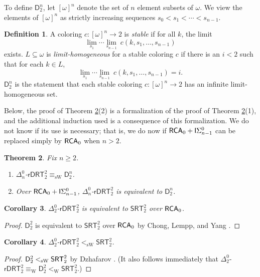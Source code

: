 \documentclass{amsart}
\newtheorem{thm}{Theorem}[section]
\newtheorem{cor}[thm]{Corollary}
\theoremstyle{definition}
\newtheorem{defn}[thm]{Definition}
\theoremstyle{remark}
\newcommand{\system}[1]{\mbox{\fontfamily{cmss}\fontshape{n}\fontseries{m}%
    \selectfont#1}}
\newcommand{\RCA}{\system{RCA}\ensuremath{_0}}
\newcommand{\SRT}{\system{SRT}}
\begin{document}
To define $\mathsf{D}^n_2$, let $[\omega]^n$ denote the set of $n$ element subsets of $\omega$. We view the elements of $[\omega]^n$ as strictly increasing sequences 
$s_0 < s_1 < \cdots < s_{n-1}$. 

\begin{defn}
A coloring $c:[\omega]^n \rightarrow 2$ is \textit{stable} if for all $k$, the limit 
\[
\lim_{s_1} \cdots \lim_{s_{n-1}}~c(k,s_1,\ldots,s_{n-1})
\]
exists. $L \subseteq \omega$ is \textit{limit-homogeneous} for a stable coloring $c$ if there is an $i < 2$ such that for each $k \in L$, 
\[
\lim_{s_1} \cdots \lim_{s_{n-1}}~c(k,s_1,\ldots,s_{n-1}) = i.
\]
$\mathsf{D}^n_2$ is the statement that each stable coloring $c : [\omega]^n \to 2$ has an infinite limit-homogeneous set. 
\end{defn}

Below, the proof of Theorem \ref{thm:sW}(2) is a formalization of the proof of Theorem \ref{thm:sW}(1), and the additional induction used is a consequence of this formalization. 
We do not know if its use is necessary; that is, we do now if $\RCA + \mathsf{I}\Sigma^0_{n-1}$ can be replaced simply by $\RCA$ when $n > 2$. 

\begin{thm}
\label{thm:sW}
Fix $n \geq 2$.
	\begin{enumerate}
		\item $\Delta^0_n$-$\mathsf{rDRT}^2_2 \equiv_{\mathrm{sW}} \mathsf{D}^n_2$.
		\item Over $\RCA + \mathsf{I}\Sigma^0_{n-1}$, $\Delta^0_n$-$\mathsf{rDRT}^2_2$ is equivalent to $\mathsf{D}^n_2$. 
	\end{enumerate}
\end{thm}

\begin{cor}
$\Delta^0_2$-$\mathsf{rDRT}^2_2$ is equivalent to $\mathsf{SRT}^2_2$ over $\RCA$.
\end{cor}

\begin{proof}
$\mathsf{D}^2_2$ is equivalent to $\mathsf{SRT}^2_2$ over $\RCA$ by Chong, Lempp, and Yang \cite{ChongLemppYang}.
\end{proof}

\begin{cor}
$\Delta^0_2$-$\mathsf{rDRT}^2_2 <_{\mathrm{sW}} \mathsf{SRT}^2_2$.
\end{cor}

\begin{proof}
$\mathsf{D}^2_2 <_{\mathrm{sW}} \SRT^2_2$ by Dzhafarov \cite[Corollary 3.3]{Dzhafarov-2015ta}. (It also 
follows immediately that $\Delta^0_2$-$\mathsf{rDRT}^2_2 \equiv_{\mathrm{W}} \mathsf{D}^2_2 <_{\mathrm{W}} \mathsf{SRT}^2_2$.)
\end{proof}
\end{document}
